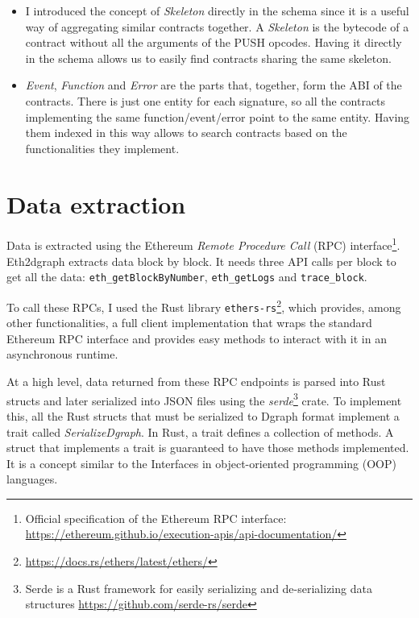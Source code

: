 \begin{itemize}
    \item I introduced the concept of \textit{Skeleton} directly in the schema since it is a useful way of aggregating similar contracts together. A \textit{Skeleton} is the bytecode of a contract without all the arguments of the PUSH opcodes. Having it directly in the schema allows us to easily find contracts sharing the same skeleton.

    \item \textit{Event}, \textit{Function} and \textit{Error} are the parts that, together, form the ABI of the contracts. There is just one entity for each signature, so all the contracts implementing the same function/event/error point to the same entity. Having them indexed in this way allows to search contracts based on the functionalities they implement.
    
\end{itemize}

\section{Data extraction}

Data is extracted using the Ethereum \textit{Remote Procedure Call} (RPC) interface\footnote{Official specification of the Ethereum RPC interface: \url{https://ethereum.github.io/execution-apis/api-documentation/}}. Eth2dgraph extracts data block by block. It needs three API calls per block to get all the data: \texttt{eth\_getBlockByNumber}, \texttt{eth\_getLogs} and \texttt{trace\_block}. 

To call these RPCs, I used the Rust library \texttt{ethers-rs}\footnote{\url{https://docs.rs/ethers/latest/ethers/}}, which provides, among other functionalities, a full client implementation that wraps the standard Ethereum RPC interface and provides easy methods to interact with it in an asynchronous runtime.

At a high level, data returned from these RPC endpoints is parsed into Rust structs and later serialized into JSON files using the \textit{serde}\footnote{Serde is a Rust framework for easily serializing and de-serializing data structures \url{https://github.com/serde-rs/serde}} crate. To implement this, all the Rust structs that must be serialized to Dgraph format implement a trait called \textit{SerializeDgraph}. In Rust, a trait defines a collection of methods. A struct that implements a trait is guaranteed to have those methods implemented. It is a concept similar to the Interfaces in object-oriented programming (OOP) languages.

